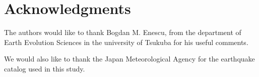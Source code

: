 


\section*{Acknowledgments}
The authors would like to thank Bogdan M. Enescu, from the department
of Earth Evolution Sciences in the university of Tsukuba for his
useful comments. 

We would also like to thank the Japan Meteorological Agency for the
earthquake catalog used in this study.
